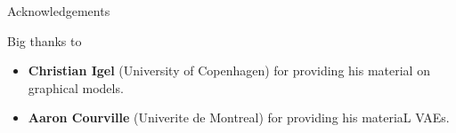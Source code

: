 \documentclass[11pt,mathserif]{beamer}
\renewcommand{\vec}[1]{{\boldsymbol{ #1}}}
\begin{document}
%
%
%



\begin{frame}{Acknowledgements}

Big thanks to 
\begin{itemize}
\item \textbf{Christian Igel} (University of Copenhagen) for providing his material on graphical models.
\item \textbf{Aaron Courville} (Univerite de Montreal) for providing his materiaL VAEs.
\end{itemize}


\end{frame}
\end{document}

